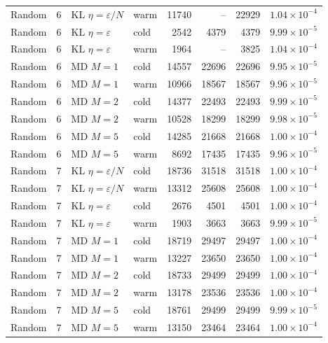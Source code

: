 \begin{table}[t]
\begin{tabular}{llllrrrr}
Random & 6 & KL $\eta=\varepsilon/N$ & warm & 11740 & -- & 22929 & $1.04\times 10^{-4}$ \\
Random & 6 & KL $\eta=\varepsilon$ & cold & 2542 & 4379 & 4379 & $9.99\times 10^{-5}$ \\
Random & 6 & KL $\eta=\varepsilon$ & warm & 1964 & -- & 3825 & $1.04\times 10^{-4}$ \\
Random & 6 & MD $M=1$ & cold & 14557 & 22696 & 22696 & $9.95\times 10^{-5}$ \\
Random & 6 & MD $M=1$ & warm & 10966 & 18567 & 18567 & $9.96\times 10^{-5}$ \\
Random & 6 & MD $M=2$ & cold & 14377 & 22493 & 22493 & $9.99\times 10^{-5}$ \\
Random & 6 & MD $M=2$ & warm & 10528 & 18299 & 18299 & $9.98\times 10^{-5}$ \\
Random & 6 & MD $M=5$ & cold & 14285 & 21668 & 21668 & $1.00\times 10^{-4}$ \\
Random & 6 & MD $M=5$ & warm & 8692 & 17435 & 17435 & $9.96\times 10^{-5}$ \\
\midrule
Random & 7 & KL $\eta=\varepsilon/N$ & cold & 18736 & 31518 & 31518 & $1.00\times 10^{-4}$ \\
Random & 7 & KL $\eta=\varepsilon/N$ & warm & 13312 & 25608 & 25608 & $1.00\times 10^{-4}$ \\
Random & 7 & KL $\eta=\varepsilon$ & cold & 2676 & 4501 & 4501 & $1.00\times 10^{-4}$ \\
Random & 7 & KL $\eta=\varepsilon$ & warm & 1903 & 3663 & 3663 & $9.99\times 10^{-5}$ \\
Random & 7 & MD $M=1$ & cold & 18719 & 29497 & 29497 & $1.00\times 10^{-4}$ \\
Random & 7 & MD $M=1$ & warm & 13227 & 23650 & 23650 & $1.00\times 10^{-4}$ \\
Random & 7 & MD $M=2$ & cold & 18733 & 29499 & 29499 & $1.00\times 10^{-4}$ \\
Random & 7 & MD $M=2$ & warm & 13178 & 23536 & 23536 & $1.00\times 10^{-4}$ \\
Random & 7 & MD $M=5$ & cold & 18761 & 29499 & 29499 & $9.99\times 10^{-5}$ \\
Random & 7 & MD $M=5$ & warm & 13150 & 23464 & 23464 & $1.00\times 10^{-4}$ \\
\bottomrule
\end{tabular}
\end{table}